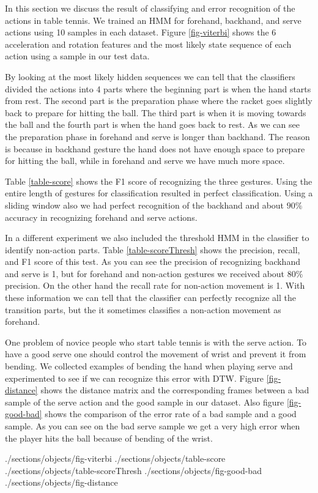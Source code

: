 In this section we discuss the result of classifying and error recognition of the actions in table tennis. We trained an HMM for forehand, backhand, and serve actions using 10 samples in each dataset. Figure \ref{fig-viterbi} shows the 6 acceleration and rotation features and the most likely state sequence of each action using a sample in our test data.

By looking at the most likely hidden sequences we can tell that the classifiers divided the actions into 4 parts where the beginning part is when the hand starts from rest. The second part is the preparation phase where the racket goes slightly back to prepare for hitting the ball. The third part is when it is moving towards the ball and the fourth part is when the hand goes back to rest. As we can see the preparation phase in forehand and serve is longer than backhand. The reason is because in backhand gesture the hand does not have enough space to prepare for hitting the ball, while in forehand and serve we have much more space.

Table \ref{table-score} shows the F1 score of recognizing the three gestures. Using the entire length of gestures for classification resulted in perfect classification. Using a sliding window also we had perfect recognition of the backhand and about $90\%$ accuracy in recognizing forehand and serve actions.

In a different experiment we also included the threshold HMM in the classifier to identify non-action parts. Table \ref{table-scoreThresh} shows the precision, recall, and F1 score of this test. As you can see the precision of recognizing backhand and serve is 1, but for forehand and non-action gestures we received about $80\%$ precision. On the other hand the recall rate for non-action movement is 1. With these information we can tell that the classifier can perfectly recognize all the transition parts, but the it sometimes classifies a non-action movement as forehand. 

One problem of novice people who start table tennis is with the serve action. To have a good serve one should control the movement of wrist and prevent it from bending. We collected examples of bending the hand when playing serve and experimented to see if we can recognize this error with DTW. Figure \ref{fig-distance} shows the distance matrix and the corresponding frames between a bad sample of the serve action and the good sample in our dataset. Also figure \ref{fig-good-bad} shows the comparison of the error rate of a bad sample and a good sample. As you can see on the bad serve sample we get a very high error when the player hits the ball because of bending of the wrist. 

 {./sections/objects/fig-viterbi}
 {./sections/objects/table-score}
 {./sections/objects/table-scoreThresh}
 {./sections/objects/fig-good-bad}
 {./sections/objects/fig-distance}